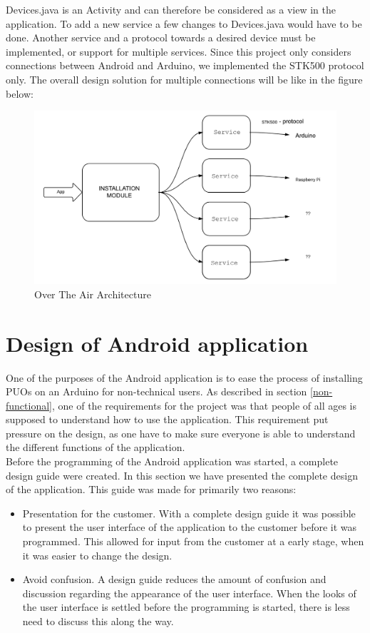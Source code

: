 	Devices.java is an Activity and can therefore be considered as a view in the application. To add a new service a few changes to Devices.java would have to be done. Another service and a protocol towards a desired device must be implemented, or support for multiple services. Since this project only considers connections between Android and Arduino, we implemented the STK500 protocol only.
	The overall design solution for multiple connections will be like in the figure below:\\
	\begin{figure}[H]
	\includegraphics[scale=0.7]{figures/OTAArchitecture.pdf}
	\caption{Over The Air Architecture}
	\end{figure}

\section{Design of Android application}
One of the purposes of the Android application is to ease the process of installing PUOs on an Arduino for non-technical users. As described in section \ref{non-functional}, one of the requirements for the project was that people of all ages is supposed to understand how to use the application. This requirement put pressure on the design, as one have to make sure everyone is able to understand the different functions of the application. \\
\newline
Before the programming of the Android application was started, a complete design guide were created. In this section we have presented the complete design of the application. This guide was made for primarily two reasons:
\begin{itemize}
	\item{Presentation for the customer.} With a complete design guide it was possible to present the user interface of the application to the customer before it was programmed. This allowed for input from the customer at a early stage, when it was easier to change the design.
	\item{Avoid confusion.} A design guide reduces the amount of confusion and discussion regarding the appearance of the user interface. When the looks of the user interface is settled before the programming is started, there is less need to discuss this along the way.
\end{itemize}

